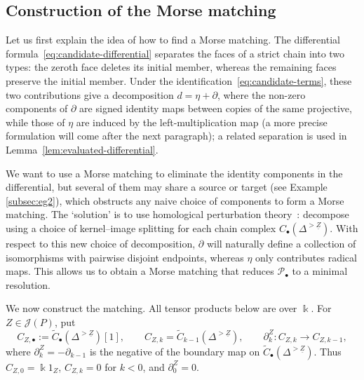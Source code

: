 \documentclass[a4paper,leqno]{amsart}
\begin{document}
\subsection{Construction of the Morse matching}
\label{subsec:construction-morse-matching}

Let us first explain the idea of how to find a Morse matching. The differential formula~\eqref{eq:candidate-differential} separates the faces of a strict chain into two types: the zeroth face deletes its initial member, whereas the remaining faces preserve the initial member.  Under the identification~\eqref{eq:candidate-terms}, these two contributions give a decomposition $d=\eta+\partial$, where the non-zero components of $\partial$ are signed identity maps between copies of the same projective, while those of $\eta$ are induced by the left-multiplication map (a more precise formulation will come after the next paragraph); a related separation is used in Lemma~\ref{lem:evaluated-differential}.

We want to use a Morse matching to eliminate the identity components in the differential, but several of them may share a source or target (see Example \ref{subsec:eg2}), which obstructs any naive choice of components to form a Morse matching. 
The `solution' is to use homological perturbation theory~\cite{GL89}: decompose using a choice of kernel--image splitting for each chain complex $C_\bullet(\Delta^{>\underline{Z}})$. 
With respect to this new choice of decomposition, $\partial$ will naturally define a collection of isomorphisms with pairwise disjoint endpoints, whereas $\eta$ only contributes radical maps.  This allows us to obtain a Morse matching that reduces $\mathcal{P}_\bullet$ to a minimal resolution.

\medskip

We now construct the matching. All tensor products below are over $\Bbbk$. For $Z\in\mathcal J(P)$, put
\[
 C_{Z,\bullet}:=\widetilde C_\bullet(\Delta^{>\underline{Z}})[1],
 \qquad C_{Z,k}=\widetilde C_{k-1}(\Delta^{>\underline{Z}}),
 \qquad \partial^Z_k:C_{Z,k}\longrightarrow C_{Z,k-1},
\]
where $\partial^Z_k = -\partial_{k-1}$ is the negative of the boundary map on $\widetilde{C}_\bullet(\Delta^{>\underline{Z}})$. Thus $C_{Z,0}=\Bbbk 1_Z$, $C_{Z,k}=0$ for $k<0$, and $\partial^Z_0=0$.
\end{document}
